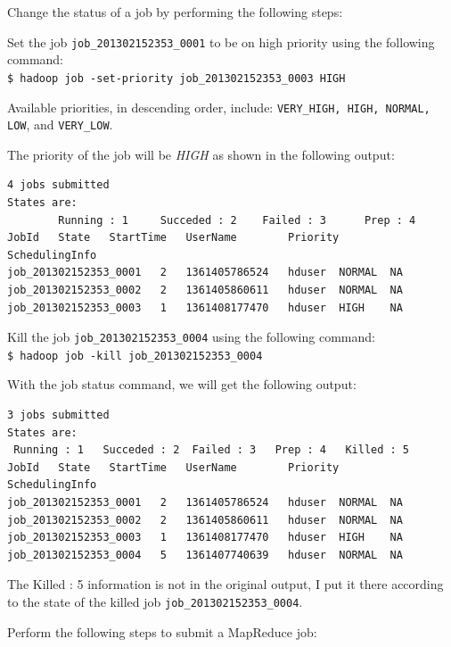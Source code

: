 Change the status of a job by performing the following steps:  

Set the job \verb|job_201302152353_0001| to be on high priority using the following command: \\
\verb|$ hadoop job -set-priority job_201302152353_0003 HIGH|

Available priorities, in descending order, include: \verb|VERY_HIGH, HIGH, NORMAL, LOW|, and \verb|VERY_LOW|.

The priority of the job will be \emph{HIGH} as shown in the following output:
\begin{verbatim}
4 jobs submitted
States are:
        Running : 1     Succeded : 2    Failed : 3      Prep : 4
JobId   State   StartTime   UserName        Priority        SchedulingInfo
job_201302152353_0001   2   1361405786524   hduser  NORMAL  NA
job_201302152353_0002   2   1361405860611   hduser  NORMAL  NA
job_201302152353_0003   1   1361408177470   hduser  HIGH    NA
\end{verbatim}

Kill the job \verb|job_201302152353_0004| using the following command: \\
\verb|$ hadoop job -kill job_201302152353_0004|

With the job status command, we will get the following output:
\begin{verbatim}
3 jobs submitted
States are:
 Running : 1   Succeded : 2  Failed : 3   Prep : 4   Killed : 5
JobId   State   StartTime   UserName        Priority        SchedulingInfo
job_201302152353_0001   2   1361405786524   hduser  NORMAL  NA
job_201302152353_0002   2   1361405860611   hduser  NORMAL  NA
job_201302152353_0003   1   1361408177470   hduser  HIGH    NA
job_201302152353_0004   5   1361407740639   hduser  NORMAL  NA
\end{verbatim}

\begin{info}
The Killed : 5 information is not in the original output, I put it there according to the state of the killed job \verb|job_201302152353_0004|.
\end{info}

Perform the following steps to submit a MapReduce job:

